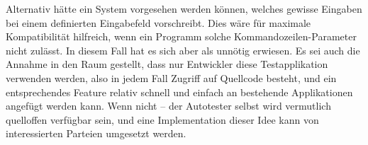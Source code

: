 Alternativ hätte ein System vorgesehen werden können, welches gewisse Eingaben
bei einem definierten Eingabefeld vorschreibt. Dies wäre für maximale Kompatibilität
hilfreich, wenn ein Programm solche Kommandozeilen-Parameter nicht zulässt.
In diesem Fall hat es sich aber als unnötig erwiesen. Es sei auch die
Annahme in den Raum gestellt, dass nur Entwickler diese Testapplikation
verwenden werden, also in jedem Fall Zugriff auf Quellcode besteht,
und ein entsprechendes Feature relativ schnell und einfach an bestehende
Applikationen angefügt werden kann. Wenn nicht -- der Autotester selbst
wird vermutlich quelloffen verfügbar sein, und eine Implementation
dieser Idee kann von interessierten Parteien umgesetzt werden.
